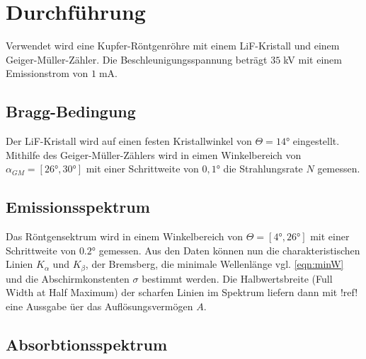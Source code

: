 \newpage
\section{Durchführung}
Verwendet wird eine Kupfer-Röntgenröhre mit einem LiF-Kristall und einem
Geiger-Müller-Zähler. Die Beschleunigungsspannung beträgt $35\;$kV mit
einem Emissionstrom von $1\;$mA.

\subsection{Bragg-Bedingung}
Der LiF-Kristall wird auf einen festen Kristallwinkel von $\Theta=14$° 
eingestellt. Mithilfe des Geiger-Müller-Zählers wird in eimen Winkelbereich
von $\alpha_{GM}=[26°,30°]$ mit einer Schrittweite von $0,1$° die Strahlungsrate $N$
gemessen.

\subsection{Emissionsspektrum}
Das Röntgensektrum wird in einem Winkelbereich von $\Theta=[4°,26°]$
mit einer Schrittweite von $0.2$°  gemessen. 
Aus den Daten können nun die charakteristischen Linien 
$K_{\alpha}$ und $K_{\beta}$, der Bremsberg, die minimale
Wellenlänge vgl. \ref{eqn:minW} und die Abschirmkonstenten $\sigma$ bestimmt werden.
Die Halbwertsbreite (Full Width at Half Maximum) der scharfen Linien 
im Spektrum liefern dann mit !ref! eine Aussgabe üer das Auflösungsvermögen $A$.
\subsection{Absorbtionsspektrum}




\label{sec:Durchfuehrung}
